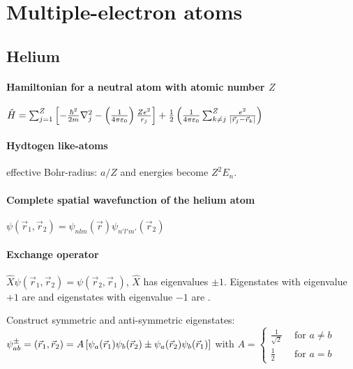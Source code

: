 \section{Multiple-electron atoms}

\subsection{Helium}

\paragraph{Hamiltonian for a neutral atom with atomic number $Z$}
$\hat{H} = \sum_{j=1}^Z \left[ - \frac{\hbar^2}{2m} \nabla_j^2 -
\left( \frac{1}{4 \pi \varepsilon_0} \right) \frac{Z e^2}{r_j} \right] + \frac{1}{2}
\left( \frac{1}{4 \pi \varepsilon_0} \sum_{k \neq j}^Z \frac{e^2}{\left\vert \vec{r}_j - \vec{r}_k \right\vert} \right)$

\paragraph{Hydtogen like-atoms}
effective Bohr-radius: $a/Z$ and energies become $Z^2 E_n$.

\paragraph{Complete spatial wavefunction of the helium atom}
$\psi(\vec{r}_1 , \vec{r}_2) = \psi_{nlm} (\vec{r}) \psi_{n' l' m'} (\vec{r}_2)$

\paragraph{Exchange operator}
$\hat{X} \psi(\vec{r}_1 , \vec{r}_2) = \psi (\vec{r}_2 , \vec{r}_1)$,
$\hat{X}$ has eigenvalues $\pm 1$. Eigenstates with eigenvalue $+1$ are
 and eigenstates with eigenvalue $-1$ are .

Construct symmetric and anti-symmetric eigenstates:
$\psi_{ab}^\pm = (\vec{r}_1 , \vec{r}_2) = A \left[ \psi_a(\vec{r}_1)
\psi_b(\vec{r}_2) \pm \psi_a (\vec{r}_2) \psi_b (\vec{r}_1) \right]$ with
$A = \begin{cases}
    \frac{1}{\sqrt{2}} \hspace{5pt} &\text{for } a \neq b
    \\
    \frac{1}{2} \hspace{5pt} &\text{for } a = b
\end{cases}$

